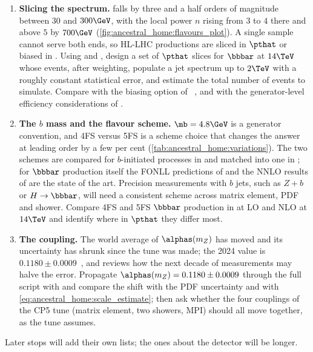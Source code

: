 \begin{enumerate}
    positive by construction~\cite{Alioli:2010xd}, and on the sample side,
    positive resampling~\cite{Andersen:2020sjs}, cell
    resampling~\cite{Andersen:2021mvw} and neural
    resampling~\cite{Nachman:2020fff}. Generate $pp\to\bbbar$ at NLO in \MG
    at $14\TeV$ with our cut, measure the negative-weight fraction, estimate
    the simulation CPU it wastes per unit of statistical precision, and ask
    which of the remedies is usable in a CMS production.
  \item \textbf{Slicing the spectrum.} 
    falls by three and a half orders of magnitude between $30$ and $300\GeV$, with the local power $n$ rising from $3$ to $4$ there and above $5$ by $700\GeV$
    (\cref{fig:ancestral_home:flavours_plot}). A single sample cannot serve
    both ends, so HL-LHC productions are sliced in $\pthat$ or biased in
    \pt. Using  and , design a set of $\pthat$
    slices for $\bbbar$ at $14\TeV$ whose events, after weighting, populate
    a jet \pt spectrum up to $2\TeV$ with a roughly constant statistical
    error, and estimate the total number of events to simulate. Compare with
    the biasing option  of
    \PYTHIA~\cite{Bierlich:2022pfr}, and with the generator-level
    efficiency considerations of \cite{HSFPhysicsEventGeneratorWG:2020gxw}.
  \item \textbf{The $b$ mass and the flavour scheme.} $\mb=4.8\GeV$ is a
    generator convention, and 4FS versus 5FS is a scheme choice that
    changes the answer at leading order by a few per cent
    (\cref{tab:ancestral_home:variations}). The two schemes are compared for
    $b$-initiated processes in \cite{Maltoni:2012pa} and matched into one in
    \cite{Forte:2015hba}; for $\bbbar$ production itself the FONLL
    predictions of \cite{Cacciari:2012ny} and the NNLO results of
    \cite{Catani:2020kkl} are the state of the art. Precision measurements
    with $b$ jets, such as $Z+b$ or $H\to\bbbar$, will need a consistent
    scheme across matrix element, PDF and shower. Compare 4FS and 5FS
    $\bbbar$ production in \MG at LO and NLO at $14\TeV$ and identify where
    in $\pthat$ they differ most.
  \item \textbf{The coupling.} The world average of $\alphas(m_Z)$ has
    moved and its uncertainty has shrunk since the tune was made; the 2024
    value is $0.1180\pm0.0009$~\cite{ParticleDataGroup:2024cfk}, and
    \cite{dEnterria:2022hzv} reviews how the next decade of measurements may
    halve the error. Propagate $\alphas(m_Z)=0.1180\pm0.0009$ through the
    full script with  and compare the shift with the PDF
    uncertainty and with \cref{eq:ancestral_home:scale_estimate}; then ask
    whether the four couplings of the CP5 tune (matrix element, two
    showers, MPI) should all move together, as the tune assumes.
\end{enumerate}
Later stops will add their own lists; the ones about the detector will be
longer.
